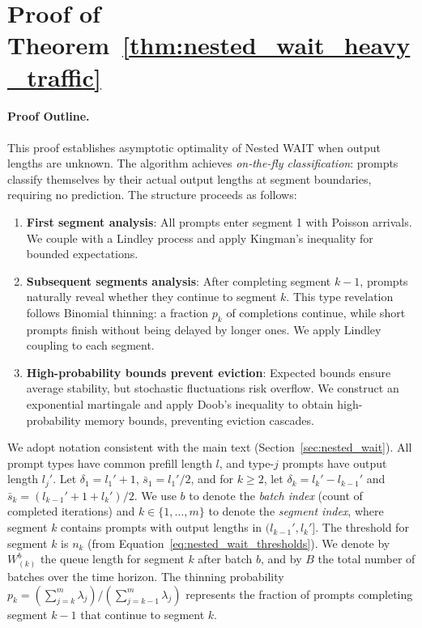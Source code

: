 
\section{Proof of Theorem~\ref{thm:nested_wait_heavy_traffic}}\label{appendix::proof of nested_wait_heavy_traffic}

\paragraph{Proof Outline.}
This proof establishes asymptotic optimality of Nested WAIT when output lengths are unknown. The algorithm achieves \emph{on-the-fly classification}: prompts classify themselves by their actual output lengths at segment boundaries, requiring no prediction. The structure proceeds as follows:
\begin{enumerate}
    \item \textbf{First segment analysis}: All prompts enter segment 1 with Poisson arrivals. We couple with a Lindley process and apply Kingman's inequality for bounded expectations.
    \item \textbf{Subsequent segments analysis}: After completing segment $k-1$, prompts naturally reveal whether they continue to segment $k$. This type revelation follows Binomial thinning: a fraction $p_k$ of completions continue, while short prompts finish without being delayed by longer ones. We apply Lindley coupling to each segment.
    \item \textbf{High-probability bounds prevent eviction}: Expected bounds ensure average stability, but stochastic fluctuations risk overflow. We construct an exponential martingale and apply Doob's inequality to obtain high-probability memory bounds, preventing eviction cascades.
\end{enumerate}

We adopt notation consistent with the main text (Section~\ref{sec:nested_wait}). All prompt types have common prefill length \(l\), and type-$j$ prompts have output length $l_j'$. Let \(\delta_1=l_1'+1\), \(\bar s_1=l_1'/2\), and for \(k\ge2\), let \(\delta_k=l_k'-l_{k-1}'\) and \(\bar s_k=(l_{k-1}'+1+l_k')/2\). We use $b$ to denote the \emph{batch index} (count of completed iterations) and $k \in \{1, \ldots, m\}$ to denote the \emph{segment index}, where segment $k$ contains prompts with output lengths in $(l_{k-1}', l_k']$. The threshold for segment $k$ is $n_k$ (from Equation~\eqref{eq:nested_wait_thresholds}). We denote by $W^b_{(k)}$ the queue length for segment $k$ after batch $b$, and by $B$ the total number of batches over the time horizon. The thinning probability $p_k = (\sum_{j=k}^m \lambda_j)/(\sum_{j=k-1}^m \lambda_j)$ represents the fraction of prompts completing segment $k-1$ that continue to segment $k$.


